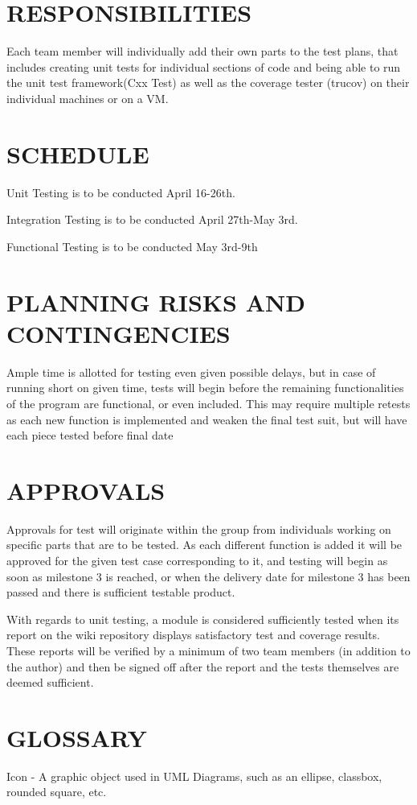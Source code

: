 \documentclass[twoside,letterpaper]{article}
\begin{document}
\section[RESPONSIBILITIES]{\bfseries\color{black} RESPONSIBILITIES}
{\color{black}
Each team member will individually add their own parts to the test plans, that includes creating unit tests for individual sections of code and being able to run the unit test framework(Cxx Test) as well as the coverage tester (trucov) on their individual machines or on a VM.
}

\section[SCHEDULE]{\bfseries\color{black} SCHEDULE}
{\color{black}
\begin{list}{-}{ }
\item Unit Testing is to be conducted April 16-26th.
\item Integration Testing is to be conducted April 27th-May 3rd.
\item Functional Testing is to be conducted May 3rd-9th
\end{list}
}

\section[PLANNING RISKS AND CONTINGENCIES]{\bfseries\color{black}
	 PLANNING RISKS AND CONTINGENCIES}
{\color{black}
Ample time is allotted for testing even given possible delays, but in case of running short on given time, tests will begin before the remaining functionalities of the program are functional, or even included. This may require multiple retests as each new function is implemented and weaken the final test suit, but will have each piece tested before final date
}

\section[APPROVALS]{\bfseries\color{black} APPROVALS}
{\color{black}
Approvals for test will originate within the group from individuals working on specific parts that are to be tested. As each different function is added it will be approved for the given test case corresponding to it, and testing will begin as soon as milestone 3 is reached, or when the delivery date for milestone 3 has been passed and there is sufficient testable product.

With regards to unit testing, a module is considered sufficiently tested when its report on the wiki repository displays satisfactory test and coverage results. These reports will be verified by a minimum of two team members (in addition to the author) and then be signed off after the report and the tests themselves are deemed sufficient.}

\section[GLOSSARY]{\bfseries\color{black} GLOSSARY}
{\color{black}
Icon - A graphic object used in UML Diagrams, such as an ellipse, classbox, rounded square, etc. 
}

\bigskip
\end{document}
